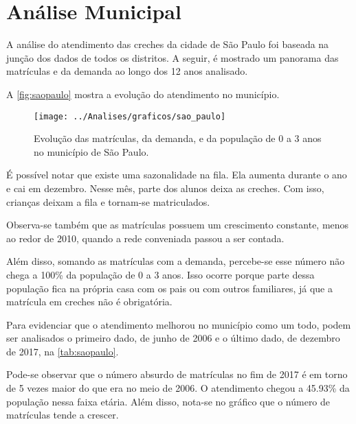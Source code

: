 \chapter{Análise Municipal}
\label{cap:sp}

\lettrine{A}{} análise do atendimento das creches da cidade de São Paulo foi baseada na junção dos dados de todos os distritos. A seguir, é mostrado um panorama das matrículas e da demanda ao longo dos 12 anos analisado.

A \autoref{fig:saopaulo} mostra a evolução do atendimento no município.

\begin{figure}[H]
	\centering
	\texttt{[image: ../Analises/graficos/sao\_paulo]}
	\caption{Evolução das matrículas, da demanda, e da população de 0 a 3 anos no município de São Paulo.}
	\label{fig:saopaulo}
\end{figure}

É possível notar que existe uma sazonalidade na fila. Ela aumenta durante o ano e cai em dezembro. Nesse mês, parte dos alunos deixa as creches. Com isso, crianças deixam a fila e tornam-se matriculados.

Observa-se também que as matrículas possuem um crescimento constante, menos ao redor de 2010, quando a rede conveniada passou a ser contada. 

Além disso, somando as matrículas com a demanda, percebe-se esse número não chega a 100\% da população de 0 a 3 anos. Isso ocorre porque parte dessa população fica na própria casa com os pais ou com outros familiares, já que a matrícula em creches não é obrigatória.

Para evidenciar que o atendimento melhorou no município como um todo, podem ser analisados o primeiro dado, de junho de 2006 e o último dado, de dezembro de 2017, na \autoref{tab:saopaulo}.

Pode-se observar que o número absurdo de matrículas no fim de 2017 é em torno de 5 vezes maior do que era no meio de 2006. O atendimento chegou a 45.93\% da população nessa faixa etária. Além disso, nota-se no gráfico que o número de matrículas tende a crescer.

